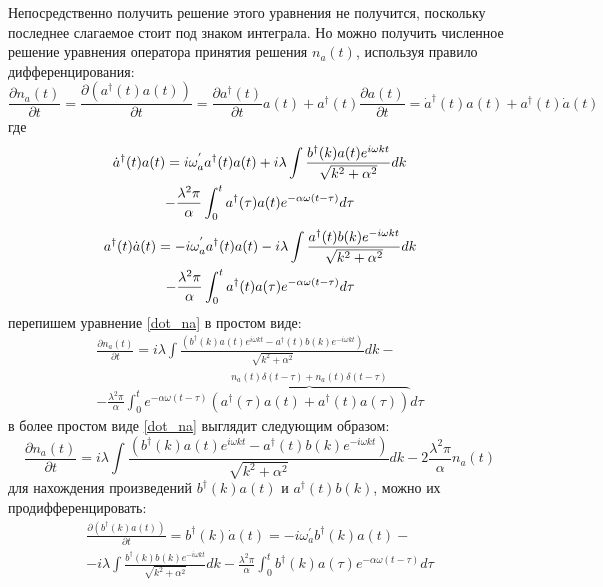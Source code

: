 Непосредственно получить решение этого уравнения не получится, поскольку последнее слагаемое
стоит под знаком интеграла. Но можно получить численное решение уравнения оператора принятия
решения $n_{a}(t)$, используя правило дифференцирования:
\begin{equation}\label{dot_na}
    \frac{\partial n_{a}(t)}{\partial t}
    = \frac{\partial (a^{\dagger}(t) a(t))}{\partial t}
    = \frac{\partial a^{\dagger}(t)}{\partial t}a(t) + a^{\dagger}(t)\frac{\partial a(t)}{\partial t}
    = \dot{a}^{\dagger}(t) a(t) + a^{\dagger}(t) \dot{a}(t)
\end{equation}
где
\begin{multline}\notag
    \dot{a}^{\dagger}(t) a(t) =
    i \omega^{'}_{a} a^{\dagger}(t) a(t) +
    i \lambda \int \frac{b^{\dagger}(k) a(t) e^{i \omega k t}}{\sqrt{k^{2} + \alpha^2}} dk \\
    - \frac{\lambda^{2} \pi}{\alpha} \int_{0}^{t} a^{\dagger}(\tau) a(t) e^{- \alpha \omega (t - \tau)} d\tau
\end{multline}
\begin{multline}\notag
    a^{\dagger}(t) \dot{a}(t) =
    -i \omega^{'}_{a} a^{\dagger}(t) a(t)
    -i \lambda \int \frac{a^{\dagger}(t) b(k)e^{-i \omega k t}}{\sqrt{k^{2} + \alpha^2}} dk \\
    - \frac{\lambda^{2} \pi}{\alpha} \int_{0}^{t} a^{\dagger}(t) a(\tau) e^{- \alpha \omega (t - \tau)} d\tau
\end{multline}
перепишем уравнение \eqref{dot_na} в простом виде:
\begin{multline}
    \frac{\partial n_{a}(t)}{\partial t} =
    i \lambda \int \frac{(b^{\dagger}(k) a(t) e^{i \omega k t} - a^{\dagger}(t) b(k)e^{-i \omega k t})}{\sqrt{k^{2} + \alpha^2}} dk - \\
    - \frac{\lambda^{2} \pi}{\alpha} \int_{0}^{t} e^{- \alpha \omega (t - \tau)} \overbrace{(a^{\dagger}(\tau) a(t) + a^{\dagger}(t) a(\tau))}^{n_{a}(t) \delta(t-\tau) + n_{a}(t) \delta(t-\tau)} d\tau
\end{multline}
в более простом виде \eqref{dot_na} выглядит следующим образом:
\begin{equation}
    \frac{\partial n_{a}(t)}{\partial t} =
    i \lambda \int \frac{(b^{\dagger}(k) a(t) e^{i \omega k t} - a^{\dagger}(t) b(k) e^{-i \omega k t})}{\sqrt{k^{2} + \alpha^2}} dk
    - 2 \frac{\lambda^{2} \pi}{\alpha} n_{a}(t)
\end{equation}
для нахождения произведений $b^{\dagger}(k) a(t)$ и $a^{\dagger}(t) b(k)$, можно их продифференцировать:
\begin{multline}\label{bcrossk_dota}
    \frac{\partial (b^{\dagger}(k) a(t))}{\partial t} =
    b^{\dagger}(k) \dot{a}(t) =
    -i \omega^{'}_{a} b^{\dagger}(k) a(t) - \\
    -i \lambda \int \frac{b^{\dagger}(k) b(k) e^{-i \omega k t}}{\sqrt{k^{2} + \alpha^2}} dk
    -\frac{\lambda^{2} \pi}{\alpha} \int_{0}^{t} b^{\dagger}(k) a(\tau) e^{- \alpha \omega (t - \tau)} d\tau
\end{multline}
